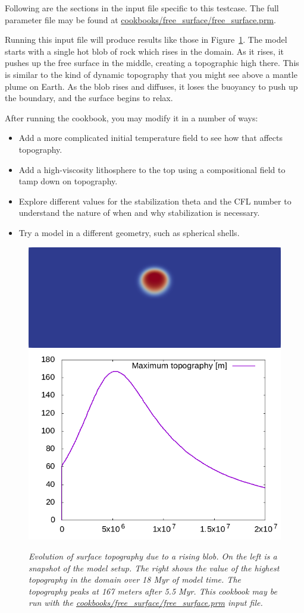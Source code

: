 Following are the sections in the input file specific to this testcase.  The full parameter
file may be found at \url{cookbooks/free_surface/free_surface.prm}.



Running this input file will produce results like those in Figure~\ref{fig:freesurface}.
The model starts with a single hot blob of rock which rises in the domain.  As it 
rises, it pushes up the free surface in the middle, creating a topographic high there.
This is similar to the kind of dynamic topography that you might see above a mantle 
plume on Earth.  As the blob rises and diffuses, it loses the buoyancy to push up 
the boundary, and the surface begins to relax.

After running the cookbook, you may modify it in a number of ways:
\begin{itemize}
\item Add a more complicated initial temperature field to see how that affects topography.
\item Add a high-viscosity lithosphere to the top using a compositional field to tamp down on topography.
\item Explore different values for the stabilization theta and the CFL number to understand the nature of when and why stabilization is necessary.
\item Try a model in a different geometry, such as spherical shells.
\end{itemize}

\begin{figure}
  \centering
  \includegraphics[height=0.25\textwidth]{cookbooks/free_surface/doc/free_surface_blob.png}
  \hfill
  \includegraphics[height=0.25\textwidth]{cookbooks/free_surface/doc/free_surface_topography.png}
  \caption{\it Evolution of surface topography due to a rising blob.  On the left is a 
           snapshot of the model setup.  The right shows the value of the highest 
           topography in the domain over 18 Myr of model time.  The topography peaks
           at 167 meters after 5.5 Myr.  This cookbook may be run with the
           \url{cookbooks/free_surface/free_surface.prm} input file.}
  \label{fig:freesurface}
\end{figure}
